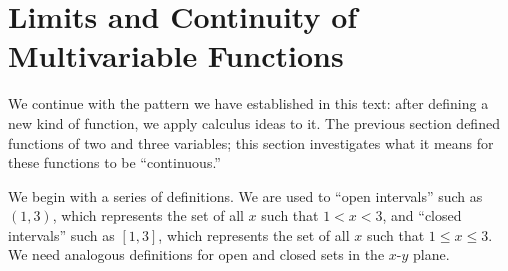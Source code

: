 \section{Limits and Continuity of Multivariable Functions}\label{sec:multi_limit}

We continue with the pattern we have established in this text: after defining a new kind of function, we apply calculus ideas to it. The previous section defined functions of two and three variables; this section investigates what it means for these functions to be ``continuous.''

We begin with a series of definitions. We are used to ``open intervals'' such as $(1,3)$, which represents the set of all $x$ such that $1<x<3$,  and ``closed intervals'' such as $[1,3]$, which represents the set of all $x$ such that $1\leq x\leq 3$. We need analogous definitions for open and closed sets in the $x$-$y$ plane.

